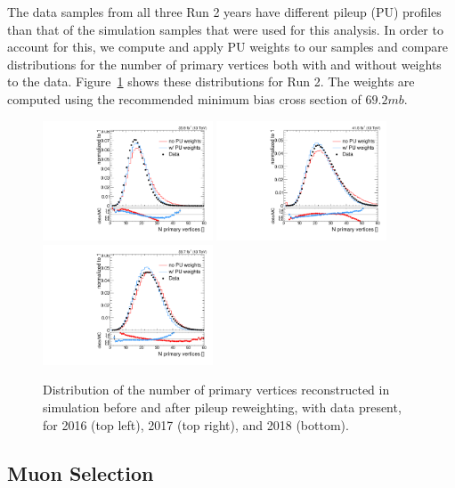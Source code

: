 The data samples from all three Run 2 years have different pileup (PU) profiles than that of the simulation samples that were used for this analysis.
In order to account for this, we compute and apply PU weights to our samples and compare distributions for the number of primary vertices both with and without weights to the data.
Figure~\ref{fig:PUreweight} shows these distributions for Run 2.
The weights are computed using the recommended minimum bias cross section of $69.2\unit{mb}$. %

\begin{figure}[htbp]
  \centering
  \includegraphics[width=0.45\textwidth]{fig/analysis/PUrewN_0_2016_nVert.pdf}
  \includegraphics[width=0.45\textwidth]{fig/analysis/PUrewN_0_2017_nVert.pdf}\\
  \includegraphics[width=0.45\textwidth]{fig/analysis/PUrewN_0_2018_nVert.pdf}
  \caption{
    Distribution of the number of primary vertices reconstructed in simulation before and after pileup reweighting, with data present, for 2016 (top left), 2017 (top right), and 2018 (bottom).
  }
  \label{fig:PUreweight}
\end{figure}

\subsection{Muon Selection}
\label{subsec:muonSelect}

